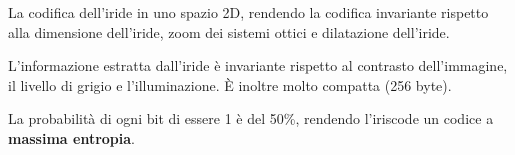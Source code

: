 La codifica dell'iride in uno spazio 2D, rendendo la codifica invariante
rispetto alla dimensione dell'iride, zoom dei sistemi ottici e dilatazione dell'iride.

L'informazione estratta dall'iride è invariante rispetto al contrasto dell'immagine, il livello di grigio e l'illuminazione.
È inoltre molto compatta (256 byte).

La probabilità di ogni bit di essere 1 è del 50\%, rendendo l'iriscode un codice a \textbf{massima entropia}.








